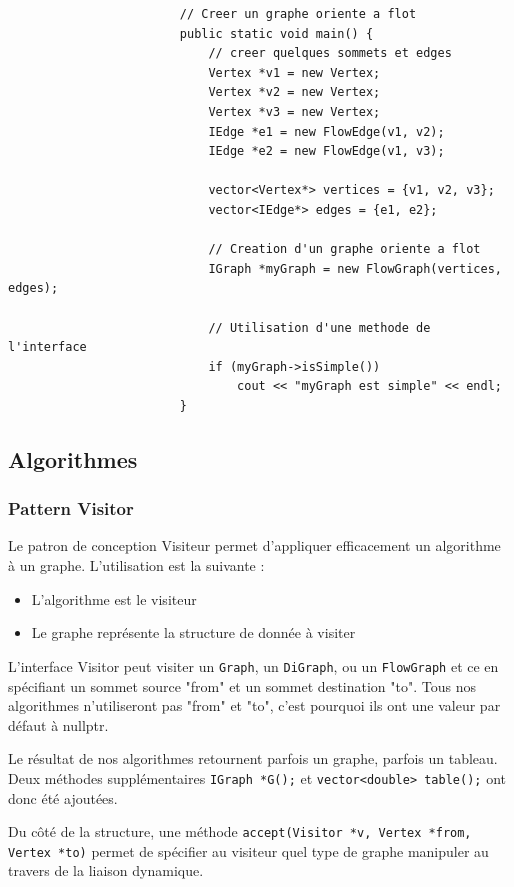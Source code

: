 \documentclass[french]{article}
\begin{document}
			\begin{lstlisting}
						// Creer un graphe oriente a flot
						public static void main() {
							// creer quelques sommets et edges
							Vertex *v1 = new Vertex;
							Vertex *v2 = new Vertex;
							Vertex *v3 = new Vertex;
							IEdge *e1 = new FlowEdge(v1, v2);
							IEdge *e2 = new FlowEdge(v1, v3);
							
							vector<Vertex*> vertices = {v1, v2, v3};
							vector<IEdge*> edges = {e1, e2};
							
							// Creation d'un graphe oriente a flot
							IGraph *myGraph = new FlowGraph(vertices, edges);
							
							// Utilisation d'une methode de l'interface
							if (myGraph->isSimple())
								cout << "myGraph est simple" << endl;
						}
			\end{lstlisting}
			
		\subsection{Algorithmes}
			\subsubsection{Pattern Visitor}
			Le patron de conception Visiteur permet d'appliquer efficacement un algorithme à un graphe. L'utilisation est la suivante :
			\begin{itemize}
				\item L'algorithme est le visiteur
				\item Le graphe représente la structure de donnée à visiter
			\end{itemize}
			L'interface Visitor peut visiter un \lstinline[basicstyle=\ttfamily\color{blue}]|Graph|, un \lstinline[basicstyle=\ttfamily\color{blue}]|DiGraph|, ou un \lstinline[basicstyle=\ttfamily\color{blue}]|FlowGraph| et ce en spécifiant un sommet source "from" et un sommet destination "to". Tous nos algorithmes n'utiliseront pas "from" et "to", c'est pourquoi ils ont une valeur par défaut à nullptr.
			
			Le résultat de nos algorithmes retournent parfois un graphe, parfois un tableau. Deux méthodes supplémentaires \lstinline[basicstyle=\ttfamily\color{blue}]|IGraph *G();| et \lstinline[basicstyle=\ttfamily\color{blue}]|vector<double> table();| ont donc été ajoutées.
			
			Du côté de la structure, une méthode \lstinline[basicstyle=\ttfamily\color{blue}]|accept(Visitor *v, Vertex *from, Vertex *to)| permet de spécifier au visiteur quel type de graphe manipuler au travers de la liaison dynamique.
			
\end{document}

